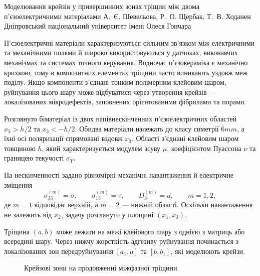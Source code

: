 \ReportHeading
  {Моделювання крейзів у привершинних зонах тріщин між двома п’єзоелектричними матеріалами}
  {А.~Є. Шевельова, Р.~О. Щербак, Т.~В. Ходанен}
  {Дніпровський національний університет імені Олеся Гончара}
  {}

П’єзоелектричні матеріали характеризуються сильним зв’язком між електричними та механічними полями й широко використовуються у датчиках, виконавчих механізмах та системах точного керування. Водночас п’єзокераміка є механічно крихкою, тому в композитних елементах тріщини часто виникають уздовж меж поділу. Якщо компоненти з’єднані тонким полімерним клейовим шаром, руйнування цього шару може відбуватися через утворення крейзів --- локалізованих мікродефектів, заповнених орієнтованими фібрилами та порами.

Розглянуто біматеріал із двох напівнескінченних п’єзоелектричних областей $x_3>h/2$ та $x_3<-h/2$. Обидва матеріали належать до класу симетрії $6mm$, а їхні осі поляризації спрямовані вздовж $x_3$. Області з’єднані клейовим шаром товщиною $h$, який характеризується модулем зсуву $\mu$, коефіцієнтом Пуассона $\nu$ та границею текучості $\sigma_Y$.

На нескінченності задано рівномірні механічні навантаження й електричне зміщення
\[
 \sigma_{33}^{(m)}=\sigma,\qquad
 \sigma_{13}^{(m)}=\tau,\qquad
 D_3^{(m)}=d,\qquad m=1,2,
\]
де $m=1$ відповідає верхній, а $m=2$ --- нижній області. Оскільки навантаження не залежить від $x_2$, задачу розглянуто у площині $(x_1,x_3)$.

Тріщина $(a,b)$ може лежати на межі клейового шару з однією з матриць або всередині шару. Через нижчу жорсткість адгезиву руйнування починається з локалізованих зон передруйнування $[a_1,a]$ та $[b,b_1]$, які моделюють крейзи.

\begin{figure}[htbp]
\centering
{}
\caption{Крейзові зони на продовженні міжфазної тріщини.}
\end{figure}

